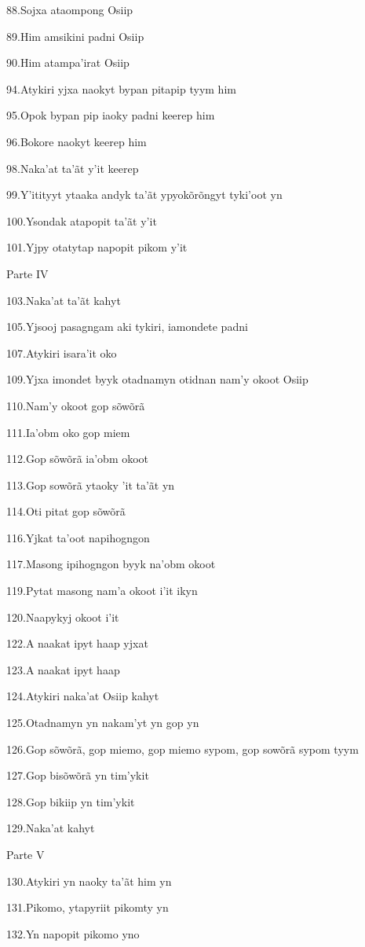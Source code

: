 88.Sojxa ataompong Osiip

89.Him amsikini padni Osiip

90.Him atampa'irat Osiip

94.Atykiri yjxa naokyt bypan pitapip tyym him

95.Opok bypan pip iaoky padni keerep him

96.Bokore naokyt keerep him

98.Naka'at ta'ãt y'it keerep

99.Y'itityyt ytaaka andyk ta'ãt ypyokõrõngyt tyki'oot yn

100.Ysondak atapopit ta'ãt y'it

101.Yjpy otatytap napopit pikom y'it

Parte IV

103.Naka'at ta'ãt kahyt

105.Yjsooj pasagngam aki tykiri, iamondete padni

107.Atykiri isara'it oko

109.Yjxa imondet byyk otadnamyn otidnan nam'y okoot Osiip

110.Nam'y okoot gop sõwõrã

111.Ia'obm oko gop miem

112.Gop sõwõrã ia'obm okoot

113.Gop sowõrã ytaoky 'it ta'ãt yn

114.Oti pitat gop sõwõrã

116.Yjkat ta'oot napihogngon

117.Masong ipihogngon byyk na'obm okoot

119.Pytat masong nam'a okoot i'it ikyn

120.Naapykyj okoot i'it

122.A naakat ipyt haap yjxat

123.A naakat ipyt haap

124.Atykiri naka'at Osiip kahyt

125.Otadnamyn yn nakam'yt yn gop yn

126.Gop sõwõrã, gop miemo, gop miemo sypom, gop sowõrã sypom tyym

127.Gop bisõwõrã yn tim'ykit

128.Gop bikiip yn tim'ykit

129.Naka'at kahyt

Parte V

130.Atykiri yn naoky ta'ãt him yn

131.Pikomo, ytapyriit pikomty yn

132.Yn napopit pikomo yno

